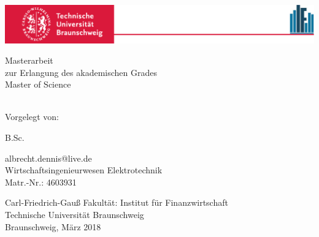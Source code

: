 
\begin{titlepage}
\thispagestyle{empty}
\begin{doublespace}
\centering


\begin{center}
	\includegraphics[width=1.0\textwidth]{Bilder/Offiziell/TUBSIF.pdf}
\end{center}

\vspace{1cm}

\begin{singlespacing}
    {\small Masterarbeit\\zur Erlangung des akademischen Grades\\Master of Science\\ \vspace{2cm}}
\end{singlespacing}


{\huge \textcolor{red}{\textbf{\titel}}}\\ \vspace{2cm}
{\small Vorgelegt von:\\ \vspace{1cm}}

{\Large B.Sc. \name}\\

\begin{singlespacing}
    albrecht.dennis@live.de\\Wirtschaftsingenieurwesen Elektrotechnik\\Matr.-Nr.: 4603931\\
\end{singlespacing}

\vspace{6cm}


\begin{singlespacing}
    Carl-Friedrich-Gauß Fakultät: Institut für Finanzwirtschaft\\Technische Universität Braunschweig\\Braunschweig, März 2018\\
\end{singlespacing}


\end{doublespace}
\end{titlepage}
